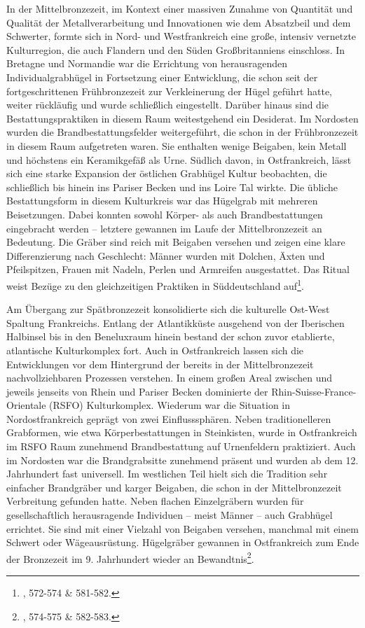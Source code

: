 \documentclass[openany,twoside,twocolumn]{book}
\let\rmarkdownfootnote\footnote%
\def\footnote{\protect\rmarkdownfootnote}
\begin{document}
In der Mittelbronzezeit, im Kontext einer massiven Zunahme von Quantität
und Qualität der Metallverarbeitung und Innovationen wie dem Absatzbeil
und dem Schwerter, formte sich in Nord- und Westfrankreich eine große,
intensiv vernetzte Kulturregion, die auch Flandern und den Süden
Großbritanniens einschloss. In Bretagne und Normandie war die Errichtung
von herausragenden Individualgrabhügel in Fortsetzung einer Entwicklung,
die schon seit der fortgeschrittenen Frühbronzezeit zur Verkleinerung
der Hügel geführt hatte, weiter rückläufig und wurde schließlich
eingestellt. Darüber hinaus sind die Bestattungspraktiken in diesem Raum
weitestgehend ein Desiderat. Im Nordosten wurden die
Brandbestattungsfelder weitergeführt, die schon in der Frühbronzezeit in
diesem Raum aufgetreten waren. Sie enthalten wenige Beigaben, kein
Metall und höchstens ein Keramikgefäß als Urne. Südlich davon, in
Ostfrankreich, lässt sich eine starke Expansion der östlichen Grabhügel
Kultur beobachten, die schließlich bis hinein ins Pariser Becken und ins
Loire Tal wirkte. Die übliche Bestattungsform in diesem Kulturkreis war
das Hügelgrab mit mehreren Beisetzungen. Dabei konnten sowohl Körper-
als auch Brandbestattungen eingebracht werden -- letztere gewannen im
Laufe der Mittelbronzezeit an Bedeutung. Die Gräber sind reich mit
Beigaben versehen und zeigen eine klare Differenzierung nach Geschlecht:
Männer wurden mit Dolchen, Äxten und Pfeilspitzen, Frauen mit Nadeln,
Perlen und Armreifen ausgestattet. Das Ritual weist Bezüge zu den
gleichzeitigen Praktiken in Süddeutschland auf\footnote{\textcite{mordant_bronze_2013},
  572-574 \& 581-582.}.

Am Übergang zur Spätbronzezeit konsolidierte sich die kulturelle
Ost-West Spaltung Frankreichs. Entlang der Atlantikküste ausgehend von
der Iberischen Halbinsel bis in den Beneluxraum hinein bestand der schon
zuvor etablierte, atlantische Kulturkomplex fort. Auch in Ostfrankreich
lassen sich die Entwicklungen vor dem Hintergrund der bereits in der
Mittelbronzezeit nachvollziehbaren Prozessen verstehen. In einem großen
Areal zwischen und jeweils jenseits von Rhein und Pariser Becken
dominierte der Rhin-Suisse-France-Orientale (RSFO) Kulturkomplex.
Wiederum war die Situation in Nordostfrankreich geprägt von zwei
Einflusssphären. Neben traditionelleren Grabformen, wie etwa
Körperbestattungen in Steinkisten, wurde in Ostfrankreich im RSFO Raum
zunehmend Brandbestattung auf Urnenfeldern praktiziert. Auch im
Nordosten war die Brandgrabsitte zunehmend präsent und wurden ab dem 12.
Jahrhundert fast universell. Im westlichen Teil hielt sich die Tradition
sehr einfacher Brandgräber und karger Beigaben, die schon in der
Mittelbronzezeit Verbreitung gefunden hatte. Neben flachen Einzelgräbern
wurden für gesellschaftlich herausragende Individuen -- meist Männer --
auch Grabhügel errichtet. Sie sind mit einer Vielzahl von Beigaben
versehen, manchmal mit einem Schwert oder Wägeausrüstung. Hügelgräber
gewannen in Ostfrankreich zum Ende der Bronzezeit im 9. Jahrhundert
wieder an Bewandtnis\footnote{\textcite{mordant_bronze_2013}, 574-575 \&
  582-583.}.
\end{document}
